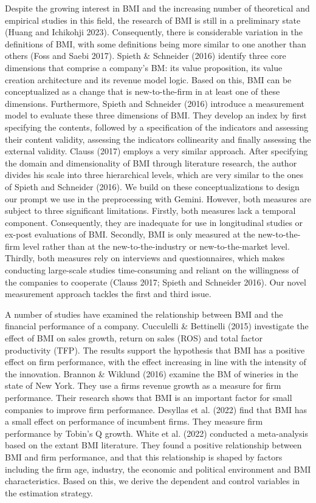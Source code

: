 \documentclass[
]{article}
\begin{document}
Despite the growing interest in BMI and the increasing number of
theoretical and empirical studies in this field, the research of BMI is
still in a preliminary state (Huang and Ichikohji 2023). Consequently,
there is considerable variation in the definitions of BMI, with some
definitions being more similar to one another than others (Foss and
Saebi 2017). Spieth \& Schneider (2016) identify three core dimensions
that comprise a company's BM: its value proposition, its value creation
architecture and its revenue model logic. Based on this, BMI can be
conceptualized as a change that is new-to-the-firm in at least one of
these dimensions. Furthermore, Spieth and Schneider (2016) introduce a
measurement model to evaluate these three dimensions of BMI. They
develop an index by first specifying the contents, followed by a
specification of the indicators and assessing their content validity,
assessing the indicators collinearity and finally assessing the external
validity. Clauss (2017) employs a very similar approach. After
specifying the domain and dimensionality of BMI through literature
research, the author divides his scale into three hierarchical levels,
which are very similar to the ones of Spieth and Schneider (2016). We
build on these conceptualizations to design our prompt we use in the
preprocessing with Gemini. However, both measures are subject to three
significant limitations. Firstly, both measures lack a temporal
component. Consequently, they are inadequate for use in longitudinal
studies or ex-post evaluations of BMI. Secondly, BMI is only measured at
the new-to-the-firm level rather than at the new-to-the-industry or
new-to-the-market level. Thirdly, both measures rely on interviews and
questionnaires, which makes conducting large-scale studies
time-consuming and reliant on the willingness of the companies to
cooperate (Clauss 2017; Spieth and Schneider 2016). Our novel
measurement approach tackles the first and third issue.

A number of studies have examined the relationship between BMI and the
financial performance of a company. Cucculelli \& Bettinelli (2015)
investigate the effect of BMI on sales growth, return on sales (ROS) and
total factor productivity (TFP). The results support the hypothesis that
BMI has a positive effect on firm performance, with the effect
increasing in line with the intensity of the innovation. Brannon \&
Wiklund (2016) examine the BM of wineries in the state of New York. They
use a firms revenue growth as a measure for firm performance. Their
research shows that BMI is an important factor for small companies to
improve firm performance. Desyllas et al. (2022) find that BMI has a
small effect on performance of incumbent firms. They measure firm
performance by Tobin's Q growth. White et al. (2022) conducted a
meta-analysis based on the extant BMI literature. They found a positive
relationship between BMI and firm performance, and that this
relationship is shaped by factors including the firm age, industry, the
economic and political environment and BMI characteristics. Based on
this, we derive the dependent and control variables in the estimation
strategy.
\end{document}
